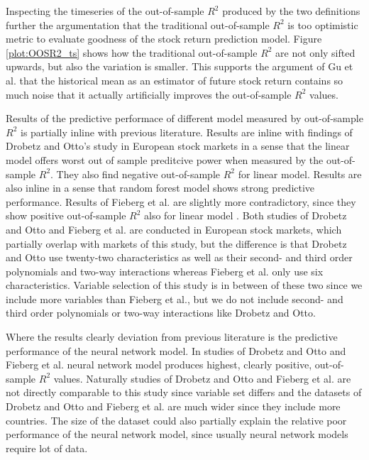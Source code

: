 \documentclass{article}
\begin{document}
Inspecting the timeseries of the out-of-sample $R^2$ produced by the two definitions further the argumentation that the traditional out-of-sample $R^2$ is too optimistic metric to evaluate goodness of the stock return prediction model. Figure \ref{plot:OOSR2_ts} shows how the traditional out-of-sample $R^2$ are not only sifted upwards, but also the variation is smaller. This supports the argument of Gu et al. \citeyear{guetal} that the historical mean as an estimator of future stock return contains so much noise that it actually artificially improves the out-of-sample $R^2$ values.

Results of the predictive performace of different model measured by out-of-sample $R^2$ is partially inline with previous literature. Results are inline with findings of Drobetz and Otto's \citeyear{Drobetz} study in European stock markets in a sense that the linear model offers worst out of sample preditcive power when measured by the out-of-sample $R^2$. They also find negative out-of-sample $R^2$ for linear model. Results are also inline in a sense that random forest model shows strong predictive performance. Results of Fieberg et al. \citeyear{Fieberg} are slightly more contradictory, since they show positive out-of-sample $R^2$ also for linear model \footnotemark. Both studies of Drobetz and Otto and Fieberg et al. are conducted in European stock markets, which partially overlap with markets of this study, but the difference is that Drobetz and Otto use twenty-two characteristics as well as their  second- and third order polynomials and two-way interactions whereas Fieberg et al. only use six characteristics. Variable selection of this study is in between of these two since we include more variables than Fieberg et al., but we do not include second- and third order polynomials or two-way interactions like Drobetz and Otto.


Where the results clearly deviation from previous literature is the predictive performance of the neural network model. In studies of Drobetz and Otto \citeyear{Drobetz} and Fieberg et al. \citeyear{Fieberg} neural network model produces highest, clearly positive, out-of-sample $R^2$ values. Naturally studies of Drobetz and Otto and Fieberg et al. are not directly comparable to this study since variable set differs and the datasets of  Drobetz and Otto and Fieberg et al. are much wider since they include more countries. The size of the dataset could also partially explain the relative poor performance of the neural network model, since usually neural network models require lot of data.
\end{document}
